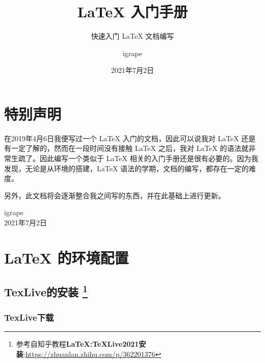 \documentclass[cn,10pt,math=newtx,citestyle=gb7714-2015,bibstyle=gb7714-2015]{elegantbook}
\title{ \LaTeX{} 入门手册}
\subtitle{快速入门 \LaTeX{} 文档编写}
\author{igrape}
\institute{TropicalTeamYard}
\date{2021年7月2日}
\begin{document}
    \maketitle

    \frontmatter

    \chapter*{特别声明}


    在2019年4月6日我便写过一个 \LaTeX{} 入门的文档，因此可以说我对 \LaTeX{} 还是有一定了解的，然而在一段时间没有接触 \LaTeX{} 之后，我对 \LaTeX{} 的语法就非常生疏了。因此编写一个类似于 \LaTeX{} 相关的入门手册还是很有必要的。因为我发现，无论是从环境的搭建，\LaTeX{} 语法的学期，文档的编写，都存在一定的难度。
    \vskip 0.5cm
    
    另外，此文档将会逐渐整合我之间写的东西，并在此基础上进行更新。
    
    \vskip 0.5cm
    

    \begin{flushright}
    igrape \\
    2021年7月2日
    \end{flushright}
    
    \tableofcontents

    \mainmatter

    \chapter{\LaTeX{} 的环境配置}

    \begin{flushright}
    \end{flushright}

    \section{TexLive的安装
        \footnote{参考自知乎教程\textbf{LaTeX:TeXLive2021安装}:\quad\url{https://zhuanlan.zhihu.com/p/362201376}}
    }

    \subsection{TexLive下载}
\end{document}
